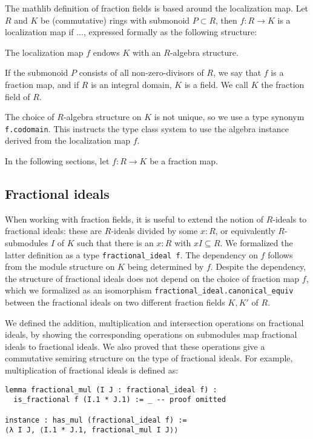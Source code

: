 \documentclass[a4paper,USenglish,cleveref, autoref, thm-restate]{lipics-v2021}
\newcommand{\lean}[1]{\texttt{#1}\xspace} %
\begin{document}
The mathlib definition of fraction fields is based around the localization map. Let $R$ and $K$ be (commutative) rings with submonoid $P \subset R$, then $f : R \to K$ is a localization map if ..., expressed formally as the following structure:

The localization map $f$ endows $K$ with an $R$-algebra structure.

If the submonoid $P$ consists of all non-zero-divisors of $R$, we say that $f$ is a fraction map, and if $R$ is an integral domain, $K$ is a field. We call $K$ the fraction field of $R$.

The choice of $R$-algebra structure on $K$ is not unique, so we use a type synonym \lean{f.codomain}. This instructs the type class system to use the algebra instance derived from the localization map $f$.

In the following sections, let $f : R \to K$ be a fraction map.

\subsection{Fractional ideals}

When working with fraction fields, it is useful to extend the notion of $R$-ideals to fractional ideals:
these are $R$-ideals divided by some $x : R$,
or equivalently $R$-submodules $I$ of $K$ such that there is an $x : R$ with $x I \subseteq R$.
We formalized the latter definition as a type \lean{fractional\_ideal f}.
The dependency on $f$ follows from the module structure on $K$ being determined by $f$.
Despite the dependency, the structure of fractional ideals does not depend on the choice of fraction map $f$,
which we formalized as an isomorphism \lean{fractional\_ideal.canonical\_equiv} between the fractional ideals on two different fraction fields $K, K'$ of $R$.

We defined the addition, multiplication and intersection operations on fractional ideals,
by showing the corresponding operations on submodules map fractional ideals to fractional ideals.
We also proved that these operations give a commutative semiring structure on the type of fractional ideals.
For example, multiplication of fractional ideals is defined as:
\begin{lstlisting}
lemma fractional_mul (I J : fractional_ideal f) :
  is_fractional f (I.1 * J.1) := _ -- proof omitted

instance : has_mul (fractional_ideal f) :=
⟨λ I J, ⟨I.1 * J.1, fractional_mul I J⟩⟩
\end{lstlisting}
\end{document}
